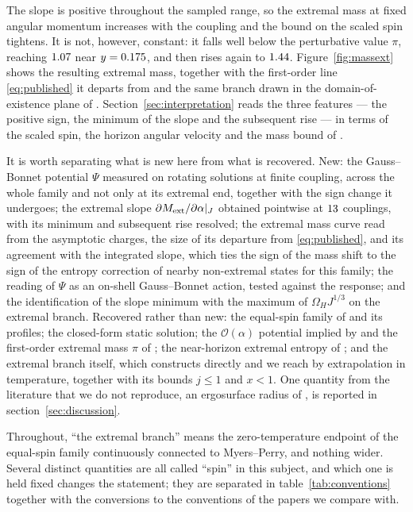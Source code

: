 \documentclass[11pt,a4paper]{article}
\begin{document}
The slope is positive throughout the sampled range, so the extremal mass at
fixed angular momentum increases with the coupling and the bound on the scaled
spin tightens. It is not, however, constant: it falls well below the
perturbative value $\pi$, reaching $1.07$ near $y=0.175$, and
then rises again to $1.44$. Figure~\ref{fig:massext} shows the
resulting extremal mass, together with the first-order line \eqref{eq:published}
it departs from and the same branch drawn in the domain-of-existence plane of
\cite{Kleihaus:2023zzs}. Section~\ref{sec:interpretation} reads the three
features --- the positive sign, the minimum of the slope and the subsequent
rise --- in terms of the scaled spin, the horizon angular velocity and the mass
bound of \cite{Kleihaus:2023zzs}.

It is worth separating what is new here from what is recovered. New: the
Gauss--Bonnet potential $\Psi$ measured on rotating solutions at finite
coupling, across the whole family and not only at its extremal end, together
with the sign change it undergoes; the extremal slope
$\partial M_{\mathrm{ext}}/\partial\alpha|_J$ obtained pointwise at $13$
couplings, with its minimum and subsequent rise resolved; the extremal mass
curve read from the asymptotic charges, the size of its departure from
\eqref{eq:published}, and its agreement with the integrated slope, which ties
the sign of the mass shift to the sign of the entropy correction of nearby
non-extremal states for this family; the reading of $\Psi$ as an on-shell
Gauss--Bonnet action, tested against the response; and the identification of
the slope minimum with the maximum of $\Omega_HJ^{1/3}$ on the extremal
branch.
Recovered rather than new: the equal-spin family of \cite{Brihaye:2010wp} and
its profiles; the closed-form static solution; the $\mathcal O(\alpha)$
potential implied by \cite{Wu:2024xnb} and the first-order extremal mass $\pi$
of \cite{Ma:2020xwi}; the near-horizon extremal entropy of
\cite{Brihaye:2010wp}; and the extremal branch itself, which
\cite{Kleihaus:2023zzs} constructs directly and we reach by extrapolation in
temperature, together with its bounds $j\le1$ and $x<1$. One quantity from the
literature that we do not reproduce, an ergosurface radius of
\cite{Brihaye:2010wp}, is
reported in section~\ref{sec:discussion}.

Throughout, ``the extremal branch'' means the zero-temperature endpoint of the
equal-spin family continuously connected to Myers--Perry, and nothing wider.
Several distinct quantities are all called ``spin'' in this subject, and which
one is held fixed changes the statement; they are separated in
table~\ref{tab:conventions} together with the conversions to the conventions of
the papers we compare with.
\end{document}
